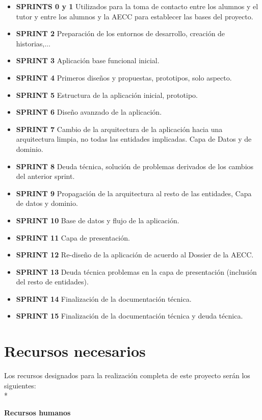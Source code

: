 \documentclass[../pfc.tex]{subfiles}
\begin{document}
	\begin{itemize}
		\item  \textbf{SPRINTS 0 y 1} Utilizados para la toma de contacto entre los alumnos y el tutor y entre los alumnos y la AECC para establecer las bases del proyecto. 
		\item  \textbf{SPRINT 2} Preparación de los entornos de desarrollo, creación de historias,...
		\item  \textbf{SPRINT 3} Aplicación base funcional inicial.
		\item  \textbf{SPRINT 4} Primeros diseños y propuestas, prototipos, solo aspecto.
		\item  \textbf{SPRINT 5} Estructura de la aplicación inicial, prototipo.
		\item  \textbf{SPRINT 6} Diseño avanzado de la aplicación.
		\item  \textbf{SPRINT 7} Cambio de la arquitectura de la aplicación hacia una arquitectura limpia, no todas las entidades implicadas.	Capa de Datos y de dominio.
		\item  \textbf{SPRINT 8} Deuda técnica, solución de problemas derivados de los cambios del anterior sprint.
		\item  \textbf{SPRINT 9} Propagación de la arquitectura al resto de las entidades, Capa de datos y dominio.
		\item  \textbf{SPRINT 10} Base de datos y flujo de la aplicación.
		\item  \textbf{SPRINT 11} Capa de presentación.
		\item  \textbf{SPRINT 12} Re-diseño de la aplicación de acuerdo al Dossier de la AECC.
		\item  \textbf{SPRINT 13} Deuda técnica problemas en la capa de presentación (inclusión del resto de entidades).
		\item  \textbf{SPRINT 14} Finalización de la documentación técnica.
		\item  \textbf{SPRINT 15} Finalización de la documentación técnica y deuda técnica.
	\end{itemize}
	
	
	\section{Recursos necesarios}
	Los recursos designados para la realización completa de este proyecto serán los siguientes:\\*
	
	\textbf{Recursos humanos}
	
\end{document}
